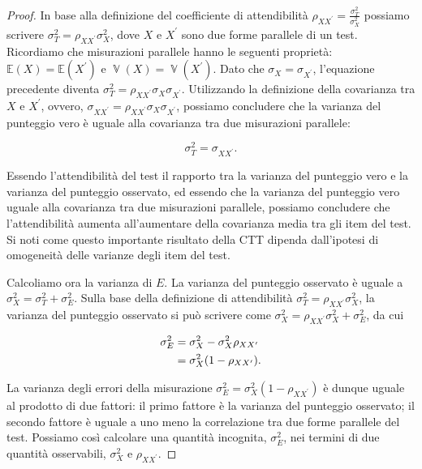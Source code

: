 \documentclass[
  11pt,
]{krantz}
\DeclareMathOperator{\V}{\mathbb{V}} %
\newcommand{\E}{\mathbb{E}} %
\theoremstyle{definition}
\theoremstyle{definition}
\theoremstyle{definition}
\theoremstyle{definition}
\theoremstyle{remark}
\begin{document}
\begin{proof}
In base alla definizione del coefficiente di attendibilità \(\rho_{XX^\prime} = \frac{\sigma^2_T}{\sigma^2_X}\) possiamo scrivere \(\sigma^2_T = \rho_{XX^\prime} \sigma^2_X\), dove \(X\) e \(X^\prime\) sono due forme parallele di un test. Ricordiamo che misurazioni parallele hanno le seguenti proprietà: \(\E(X) = \E(X^\prime)\) e \(\V(X) = \V(X^\prime)\). Dato che \(\sigma_{X}=\sigma_{X^\prime}\), l'equazione precedente diventa \(\sigma^2_T = \rho_{XX^\prime} \sigma_X\sigma_{X^\prime}.\) Utilizzando la definizione della covarianza tra \(X\) e \(X^\prime\), ovvero, \(\sigma_{XX^\prime}=\rho_{XX^\prime}\sigma_X\sigma_{X^\prime}\), possiamo concludere che la varianza del punteggio vero è uguale alla covarianza tra due misurazioni parallele:

\[
\sigma^2_T =  \sigma_{XX^\prime}.
\]

Essendo l'attendibilità del test il rapporto tra la varianza del punteggio vero e la varianza del punteggio osservato, ed essendo che la varianza del punteggio vero uguale alla covarianza tra due misurazioni parallele, possiamo concludere che l'attendibilità aumenta all'aumentare della covarianza media tra gli item del test. Si noti come questo importante risultato della CTT dipenda dall'ipotesi di omogeneità delle varianze degli item del test.

Calcoliamo ora la varianza di \(E\). La varianza del punteggio osservato è uguale a \(\sigma^2_X = \sigma^2_T + \sigma^2_E.\) Sulla base della definizione di attendibilità \(\sigma^2_T = \rho_{XX^\prime} \sigma^2_X\), la varianza del punteggio osservato si può scrivere come \(\sigma^2_X =\rho_{XX^\prime} \sigma^2_X + \sigma^2_E\), da cui

\begin{equation}
\begin{aligned}
\sigma^2_E &= \sigma^2_X - \sigma^2_X\rho_{XX^\prime}\notag\\
&= \sigma^2_X (1 -\rho_{XX^\prime}).
\end{aligned}
\end{equation}

La varianza degli errori della misurazione \(\sigma^2_E = \sigma^2_X (1 -\rho_{XX^\prime})\) è dunque uguale al prodotto di due fattori: il primo fattore è la varianza del punteggio osservato; il secondo fattore è uguale a uno meno la correlazione tra due forme parallele del test. Possiamo così calcolare una quantità incognita, \(\sigma^2_E\), nei termini di due quantità osservabili, \(\sigma^2_X\) e \(\rho_{XX^\prime}\).
\end{proof}
\end{document}
